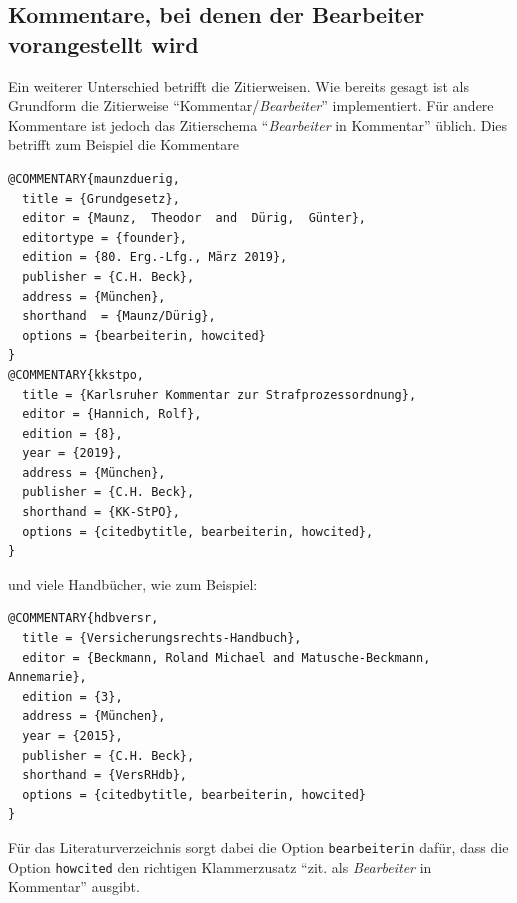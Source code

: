\documentclass[headings=small,numbers=noenddot, 12pt,oneside]{scrartcl}
\begin{document}
\subsection{Kommentare, bei denen der Bearbeiter vorangestellt wird}
Ein weiterer Unterschied betrifft die Zitierweisen. Wie bereits gesagt ist als Grundform die Zitierweise \enquote{Kommentar/\emph{Bearbeiter}} implementiert. Für andere Kommentare ist jedoch das Zitierschema \enquote{\emph{Bearbeiter} in Kommentar} üblich. Dies betrifft zum Beispiel die Kommentare
\begin{verbatim}
@COMMENTARY{maunzduerig,
  title = {Grundgesetz},
  editor = {Maunz,  Theodor  and  Dürig,  Günter},
  editortype = {founder},
  edition = {80. Erg.-Lfg., März 2019},
  publisher = {C.H. Beck},
  address = {München},
  shorthand  = {Maunz/Dürig},   
  options = {bearbeiterin, howcited}
}
@COMMENTARY{kkstpo,
  title = {Karlsruher Kommentar zur Strafprozessordnung},
  editor = {Hannich, Rolf},
  edition = {8},
  year = {2019},
  address = {München},
  publisher = {C.H. Beck},
  shorthand = {KK-StPO},
  options = {citedbytitle, bearbeiterin, howcited},
}
\end{verbatim}
und viele Handbücher, wie zum Beispiel:
\begin{verbatim}
@COMMENTARY{hdbversr,
  title = {Versicherungsrechts-Handbuch},
  editor = {Beckmann, Roland Michael and Matusche-Beckmann, Annemarie},
  edition = {3},
  address = {München},
  year = {2015},
  publisher = {C.H. Beck},
  shorthand = {VersRHdb},
  options = {citedbytitle, bearbeiterin, howcited}
}
\end{verbatim}
Für das Literaturverzeichnis sorgt dabei die Option \texttt{bearbeiterin} dafür, dass die Option \texttt{howcited} den richtigen Klammerzusatz \enquote{zit. als \emph{Bearbeiter} in Kommentar} ausgibt. 
\end{document}
